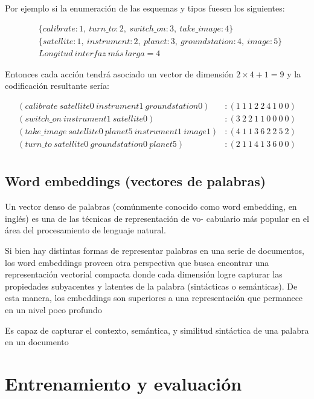 Por ejemplo si la enumeración de las esquemas y tipos fuesen los siguientes:

\begin{align*}
    &\{calibrate: 1,\ turn\_to: 2,\ switch\_on:3,\ take\_image:4 \} \\
    &\{satellite: 1,\ instrument: 2,\ planet: 3,\ groundstation: 4,\ image: 5\} \\
    & Longitud\ interfaz\ más\ larga = 4
\end{align*}

Entonces cada acción tendrá asociado un vector de dimensión $2 \times 4 + 1 = 9$
y la codificación resultante sería:

\begin{align*}
    (calibrate\ satellite0\ instrument1\ groundstation0) &: (1\ 1\ 1\ 2\ 2\ 4\ 1\ 0\ 0) \\
    (switch\_on\ instrument1\ satellite0) &: (3\ 2\ 2\ 1\ 1\ 0\ 0\ 0\ 0) \\
    (take\_image\ satellite0\ planet5\ instrument1\ image1) &: (4\ 1\ 1\ 3\ 6\ 2\ 2\ 5\ 2) \\
    (turn\_to\ satellite0\ groundstation0\ planet5) &: (2\ 1\ 1\ 4\ 1\ 3\ 6\ 0\ 0) \\
\end{align*}





\subsection{Word embeddings (vectores de palabras)}

Un vector denso de palabras (comúnmente conocido como word
embedding, en inglés) es una de las técnicas de representación de vo-
cabulario más popular en el área del procesamiento de lenguaje natural.

Si bien hay distintas formas de representar palabras en una serie de documentos,
los word embeddings proveen otra perspectiva que busca encontrar una
representación vectorial compacta donde cada dimensión logre capturar las
propiedades subyacentes y latentes de la palabra (sintácticas o semánticas). De
esta manera, los embeddings son superiores a una representación que permanece en
un nivel poco profundo

Es capaz de capturar el contexto, semántica, y similitud sintáctica de una
palabra en un documento

\section{Entrenamiento y evaluación}

